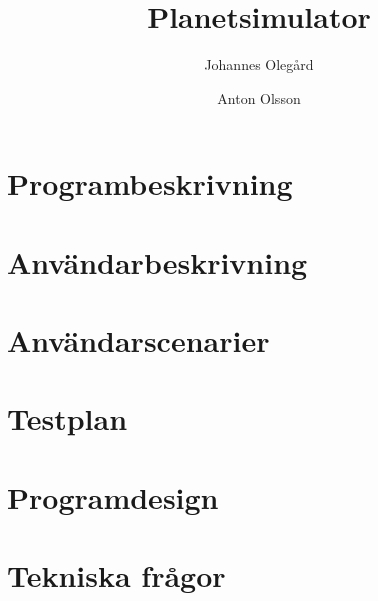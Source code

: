\documentclass[a4paper, 11pt]{article}
\title{Planetsimulator}
\author{Johannes Olegård \and Anton Olsson}
\begin{document}
\maketitle

\section{Programbeskrivning}
\label{sec:progb}


\vspace{12pt}

\vspace{12pt}


\section{Användarbeskrivning}
\label{sec:anvb}


\vspace{12pt}

\vspace{12pt}


\section{Användarscenarier}
\label{sec:anvsc}


\vspace{12pt}

\vspace{12pt}


\section{Testplan}
\label{sec:testplan}


\vspace{12pt}

\vspace{12pt}


\section{Programdesign}
\label{sec:design}

\vspace{12pt}

\vspace{12pt}


\section{Tekniska frågor}
\label{sec:qa}

\vspace{12pt}

\vspace{12pt}

\end{document}

